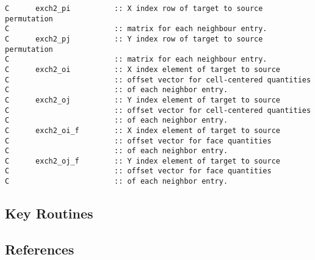 \begin{verbatim}



C      exch2_pi          :: X index row of target to source permutation 
C                        :: matrix for each neighbour entry.            
C      exch2_pj          :: Y index row of target to source permutation 
C                        :: matrix for each neighbour entry.            
C      exch2_oi          :: X index element of target to source 
C                        :: offset vector for cell-centered quantities  
C                        :: of each neighbor entry.                     
C      exch2_oj          :: Y index element of target to source 
C                        :: offset vector for cell-centered quantities  
C                        :: of each neighbor entry.                     
C      exch2_oi_f        :: X index element of target to source 
C                        :: offset vector for face quantities           
C                        :: of each neighbor entry.                     
C      exch2_oj_f        :: Y index element of target to source 
C                        :: offset vector for face quantities           
C                        :: of each neighbor entry.                     
\end{verbatim}




\subsection{Key Routines}



\subsection{References}
